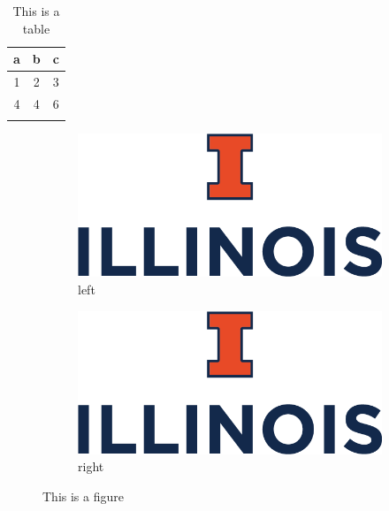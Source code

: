 \begin{frame}{}
	\begin{table}
		\begin{tabular}{c c c}
			\thickhline
			a & b & c \\
			\hline
			1 & 2 & 3 \\
			4 & 4 & 6 \\
			\thickhline
		\end{tabular}
		\caption{This is a table}
		\label{tab:table1}
	\end{table}

	\begin{figure}
		\centering
		\begin{subfigure}[t]{0.3\textwidth}
			\includegraphics[width=\textwidth]{images/ui_logo.png}
			\caption{left}
			\label{sfig:figure1a}
		\end{subfigure}
		\hfill
		\begin{subfigure}[t]{0.3\textwidth}
			\includegraphics[width=\textwidth]{images/ui_logo.png}
			\caption{right}
			\label{sfig:figure1b}
		\end{subfigure}
		\caption{This is a figure}
		\label{fig:figure1}
	\end{figure}
\end{frame}
